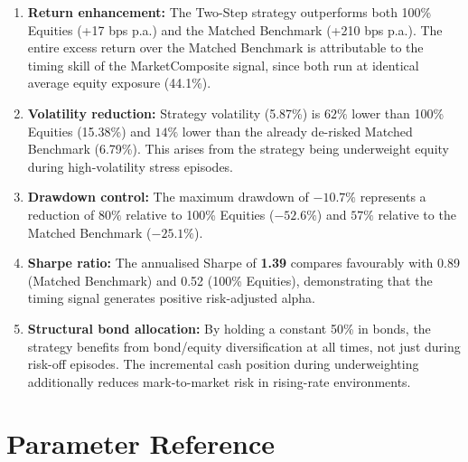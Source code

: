 \documentclass[11pt, a4paper]{article}
\begin{document}
\begin{enumerate}[leftmargin=2em]
  \item \textbf{Return enhancement:} The Two-Step strategy outperforms both
        100\% Equities (+17 bps p.a.) and the Matched Benchmark (+210 bps
        p.a.). The entire excess return over the Matched Benchmark is
        attributable to the timing skill of the MarketComposite signal,
        since both run at identical average equity exposure (44.1\%).

  \item \textbf{Volatility reduction:} Strategy volatility (5.87\%) is
        $62\%$ lower than 100\% Equities (15.38\%) and $14\%$ lower than
        the already de-risked Matched Benchmark (6.79\%). This arises from
        the strategy being underweight equity during high-volatility stress
        episodes.

  \item \textbf{Drawdown control:} The maximum drawdown of $-10.7\%$
        represents a reduction of $80\%$ relative to 100\% Equities
        ($-52.6\%$) and $57\%$ relative to the Matched Benchmark ($-25.1\%$).

  \item \textbf{Sharpe ratio:} The annualised Sharpe of \textbf{1.39}
        compares favourably with 0.89 (Matched Benchmark) and 0.52
        (100\% Equities), demonstrating that the timing signal generates
        positive risk-adjusted alpha.

  \item \textbf{Structural bond allocation:} By holding a constant 50\%
        in bonds, the strategy benefits from bond/equity diversification
        at all times, not just during risk-off episodes. The incremental
        cash position during underweighting additionally reduces
        mark-to-market risk in rising-rate environments.
\end{enumerate}

\section{Parameter Reference}
\label{sec:params}
\end{document}
